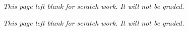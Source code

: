 \documentclass{article}
\begin{document}
\begin{enumerate}
\newpage
\emph{This page left blank for scratch work. It will not be graded.}

\newpage
\emph{This page left blank for scratch work. It will not be graded.}

\end{enumerate}
\end{document}
